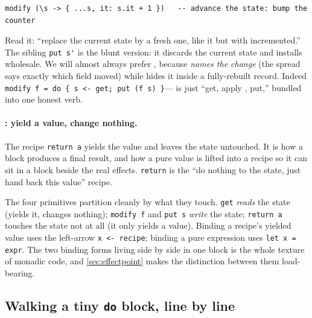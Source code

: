 \begin{lstlisting}[style=l4style]
modify (\s -> { ...s, it: s.it + 1 })   -- advance the state: bump the counter
\end{lstlisting}

\noindent Read it: ``replace the current state by a fresh one, like it but with
 incremented.'' The sibling \lstinline[style=l4style]|put s'| is the blunt
version: it discards the current state and installs  wholesale. We will
almost always prefer , because  \emph{names the change}
(the spread says exactly which field moved) while  hides it inside a
fully-rebuilt record. Indeed
\lstinline[style=l4style]|modify f = do { s <- get; put (f s) }|--- is
just ``get, apply , put,'' bundled into one honest verb.

\paragraph{: yield a value, change nothing.} The recipe
\lstinline[style=l4style]|return a| yields the value  and leaves the state
untouched. It is how a  block produces a final result, and how a pure value
is lifted into a recipe so it can sit in a  block beside the real effects.
\lstinline[style=l4style]|return| is the ``do nothing to the state, just hand back
this value'' recipe.

\begin{notationbox}
The four primitives partition cleanly by what they touch.
\lstinline[style=l4style]|get| \emph{reads} the state (yields it, changes nothing);
\lstinline[style=l4style]|modify f| and \lstinline[style=l4style]|put s| \emph{write}
the state; \lstinline[style=l4style]|return a| touches the state not at all (it only
yields a value). Binding a recipe's yielded value uses the left-arrow
\lstinline[style=l4style]|x <- recipe|; binding a pure expression uses
\lstinline[style=l4style]|let x = expr|. The two binding forms living side by side in
one  block is the whole texture of monadic code, and \cref{sec:effectpoint}
makes the distinction between them load-bearing.
\end{notationbox}

\subsection{Walking a tiny \texttt{do} block, line by line}
\label{sec:walkdo}

